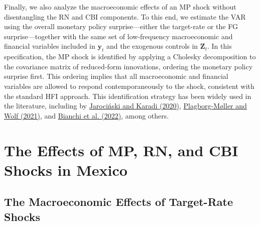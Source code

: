 \documentclass[12pt, reqno]{article}
\begin{document}
Finally, we also analyze the macroeconomic effects of an MP shock without disentangling the RN and CBI components. To this end, we estimate the VAR using the overall monetary policy surprise—either the target-rate or the FG surprise—together with the same set of low-frequency macroeconomic and financial variables included in $\boldsymbol{y}_t$ and the exogenous controls in $\boldsymbol{Z}_t$. In this specification, the MP shock is identified by applying a Cholesky decomposition to the covariance matrix of reduced-form innovations, ordering the monetary policy surprise first. This ordering implies that all macroeconomic and financial variables are allowed to respond contemporaneously to the shock, consistent with the standard HFI approach. This identification strategy has been widely used in the literature, including by \hyperlink{JK (2020)}{Jarociński and Karadi (2020)}, \hyperlink{Plagborg-Møller and Wolf (2021)}{Plagborg-Møller and Wolf (2021)}, and \hyperlink{Bianchi et al. (2022)}{Bianchi et al. (2022)}, among others.


\section{The Effects of MP, RN, and CBI Shocks in Mexico}
\hypertarget{Section 3}{}

\subsection{The Macroeconomic Effects of Target-Rate Shocks}
\end{document}
